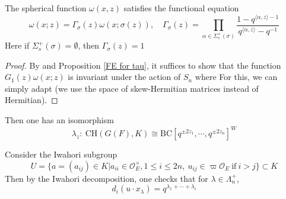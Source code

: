 \documentclass{amsart}
\theoremstyle{definition}
\theoremstyle{remark}
\newcommand{\1}{\mathbf{1}}
\newcommand{\CH}{\mathrm{CH}}
\theoremstyle{definition}
\newcommand{\BC}{\mathrm{BC}}
\newcommand{\CO}{{\mathcal {O}}}
\begin{document}
\begin{thm}The spherical function $\omega(x,z)$ satisfies the functional equation 
\[\omega(x;z)=\Gamma_\sigma(z)\omega(x;\sigma(z)),\quad \Gamma_\sigma(z)=\prod_{\alpha\in\Sigma_s^+(\sigma)}\frac{1-q^{\langle \alpha,z\rangle-1}}{q^{\langle \alpha,z\rangle}-q^{-1}}\]
Here if $\Sigma_s^+(\sigma)=\emptyset$, then $\Gamma_\sigma(z)=1$
\end{thm}
 \begin{proof}By \cite[Thm 2.5]{Hir11} and Proposition \ref{FE for tau}, it suffices to show  that the function $G_1(z)\omega(x;z)$ is invariant under the action of $S_n$ where For this, we can simply adapt  
 \cite[Theorem 2.6]{HK14} (we use the space of skew-Hermitian matrices instead of Hermitian).  
 \end{proof}



Then one has an isomorphism 
\[\lambda_z:\ \CH(G(F),K)\cong \BC[q^{\pm2z_1},\cdots,q^{\pm2z_n}]^W\]




Consider the Iwahori subgroup \[U=\{a=(a_{ij})\in K| a_{ii}\in \CO_E^\times, 1\leq i\leq 2n,\ u_{ij}\in\varpi\CO_E\ \text{if}\ i>j\}\subset K\] 
Then by the Iwahori decomposition, one checks that for $\lambda\in\Lambda_n^+$, 
\[d_i(u\cdot x_\lambda)=q^{\lambda_1+\cdots+\lambda_i}\]



  \fi



\end{document}
